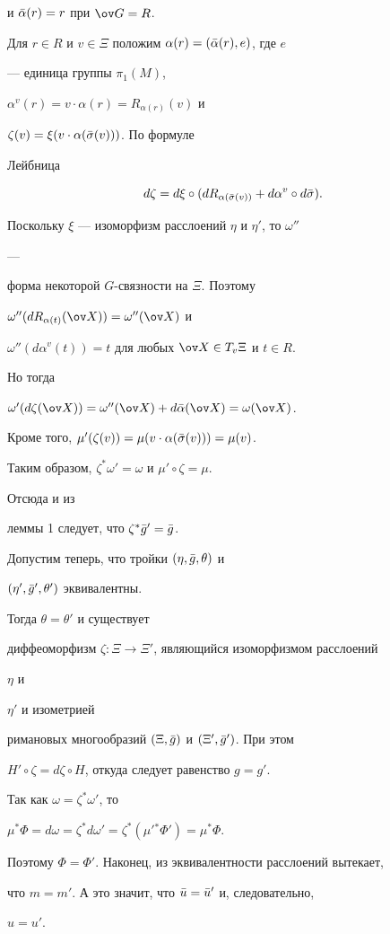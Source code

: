 \begin{pf}
и $\Bar\alpha(r)=r$ при $\ov G=R$. 


Для $r\in R$ и $v\in\Xi$ положим $\alpha(r)=(\Bar\alpha(r),e)$, где $e$ 


--- единица группы $\pi_1(M)$, 


$\alpha^v(r)=v\cdot\alpha(r)=R_{\alpha(r)}(v)$ и 


$\zeta(v)=\xi(v\cdot\alpha(\Bar\sigma(v)))$. По формуле 


Лейбница 


$$ 


d\zeta=d\xi\circ(dR_{\alpha(\Bar\sigma(v))}+d\alpha^v\circ d\Bar\sigma). 


$$ 


Поскольку $\xi$ --- изоморфизм расслоений $\eta$ и $\eta'$, то $\omega''$ 


--- 


форма некоторой $G$-связности на $\Xi$. Поэтому 


$\omega''(dR_{\alpha(t)}(\ov X))=\omega''(\ov X)$ и 


$\omega''(d\alpha^v(t))=t$ для любых $\ov X\in T_v\Xi$ и $t\in R$. 


Но тогда 


$\omega'(d\zeta(\ov X))=\omega''(\ov X)+d\Bar\alpha(\ov X) 


=\omega(\ov X)$. 


Кроме того, $\mu'(\zeta(v))=\mu(v\cdot\alpha(\Bar\sigma(v)))=\mu(v)$. 


Таким образом, $\zeta^*\omega'=\omega$ и $\mu'\circ\zeta=\mu$. 


Отсюда и из 


леммы 1 следует, что $\zeta^*\Bar g'=\Bar g$. 


 


Допустим теперь, что тройки $(\eta,\Bar g,\theta)$ и 


$(\eta',\Bar g',\theta')$ эквивалентны. 


Тогда $\theta=\theta'$ и существует 


диффеоморфизм $\zeta:\Xi\to\Xi'$, являющийся изоморфизмом расслоений 


$\eta$ и 


$\eta'$ и изометрией 


римановых многообразий $(\Xi,\Bar g)$ и $(\Xi',\Bar g')$. При этом 


$H'\circ\zeta=d\zeta\circ H$, откуда следует равенство $g=g'$. 


Так как $\omega=\zeta^*\omega'$, то 


$\mu^*\Phi=d\omega=\zeta^*d\omega'=\zeta^*(\mu'{}^*\Phi')=\mu^*\Phi$. 


Поэтому $\Phi=\Phi'$. Наконец, из эквивалентности расслоений вытекает, 


что $m=m'$. А это значит, что $\Bar u=\Bar u'$ и, следовательно, 


$u=u'$. 


\end{pf} 






